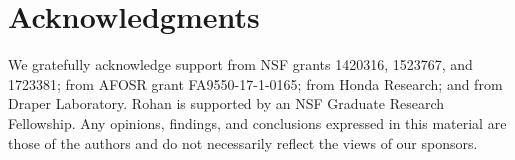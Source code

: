 \documentclass[letterpaper, 10 pt, conference]{ieeeconf}  %
\begin{document}

\section*{Acknowledgments}
We gratefully acknowledge support from NSF grants 1420316, 1523767,
and 1723381; from AFOSR grant FA9550-17-1-0165; from Honda Research;
and from Draper Laboratory. Rohan is supported by an NSF Graduate
Research Fellowship. Any opinions, findings, and conclusions expressed
in this material are those of the authors and do not necessarily
reflect the views of our sponsors.






\end{document}
